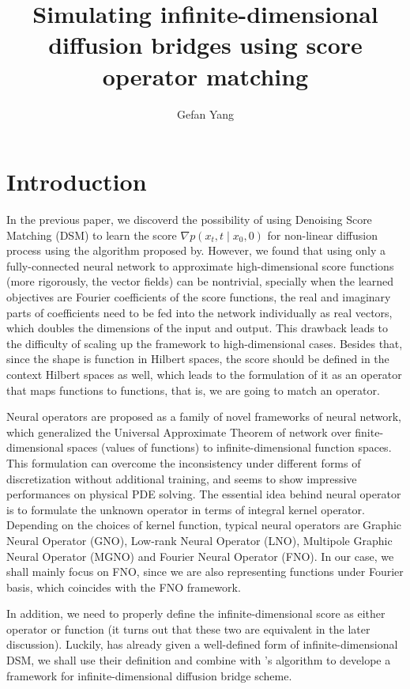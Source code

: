 \documentclass{article}
\title{Simulating infinite-dimensional diffusion bridges using score operator matching}
\author{Gefan Yang}
\begin{document}
\maketitle

\section{Introduction}
In the previous paper\cite{baker2024conditioning}, we discoverd the possibility of using Denoising Score Matching (DSM) to learn the score $\nabla p(x_t,t\mid x_0, 0)$ for non-linear diffusion process using the algorithm proposed by\cite{heng2022simulating}. However, we found that using only a fully-connected neural network to approximate high-dimensional score functions (more rigorously, the vector fields) can be nontrivial, specially when the learned objectives are Fourier coefficients of the score functions, the real and imaginary parts of coefficients need to be fed into the network individually as real vectors, which doubles the dimensions of the input and output. This drawback leads to the difficulty of scaling up the framework to high-dimensional cases. Besides that, since the shape is function in Hilbert spaces, the score should be defined in the context Hilbert spaces as well, which leads to the formulation of it as an operator that maps functions to functions, that is, we are going to match an operator.

Neural operators are proposed as a family of novel frameworks of neural network, which generalized the Universal Approximate Theorem of network over finite-dimensional spaces (values of functions) to infinite-dimensional function spaces. This formulation can overcome the inconsistency under different forms of discretization without additional training, and seems to show impressive performances on physical PDE solving. The essential idea behind neural operator is to formulate the unknown operator in terms of integral kernel operator. Depending on the choices of kernel function, typical neural operators are Graphic Neural Operator (GNO)\cite{li2020neural}, Low-rank Neural Operator (LNO)\cite{lu2021}, Multipole Graphic Neural Operator (MGNO)\cite{li2020multipole} and Fourier Neural Operator (FNO)\cite{li2021fourier}. In our case, we shall mainly focus on FNO, since we are also representing functions under Fourier basis, which coincides with the FNO framework.

In addition, we need to properly define the infinite-dimensional score as either operator or function (it turns out that these two are equivalent in the later discussion). Luckily, \cite{lim2023scorebased} has already given a well-defined form of infinite-dimensional DSM, we shall use their definition and combine with \cite{heng2022simulating}'s algorithm to develope a framework for infinite-dimensional diffusion bridge scheme.
\end{document}
